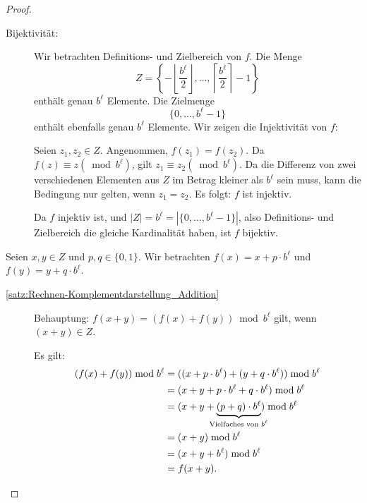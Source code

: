 \documentclass{article}
\begin{document}
    \begin{proof}
      \begin{description}
        \item[Bijektivität:] Wir betrachten Definitions- und Zielbereich von $f$.
          Die Menge \[Z = \left\{ - \left\lfloor \displaystyle\frac{b^\ell}{2} \right\rfloor , \dots, \left\lceil \displaystyle\frac{b^\ell}{2} \right\rceil -1 \right\}\] enthält genau $b^\ell$ Elemente.
          Die Zielmenge \[\{0,\dots,b^\ell-1\}\] enthält ebenfalls genau $b^\ell$ Elemente.
          Wir zeigen die Injektivität von $f$: 

          Seien $z_1, z_2 \in Z$. Angenommen, $f(z_1) = f(z_2)$.
          Da $f(z) \equiv z (\bmod b^\ell)$, gilt $z_1 \equiv z_2 (\bmod b^\ell)$.
          Da die Differenz von zwei verschiedenen Elementen aus $Z$ im Betrag kleiner als $b^\ell$ sein muss, kann die Bedingung nur gelten, wenn $z_1 = z_2$.
          Es folgt: $f$ ist injektiv.

          \noindent Da $f$ injektiv ist, und $|Z| = b^\ell = |\{0,\dots,b^\ell-1\}|$, also Definitions- und Zielbereich die gleiche Kardinalität haben, ist $f$ bijektiv.
      \end{description}

      \vspace{\baselineskip}

      Seien $x,y \in Z$ und $p,q \in \{0,1\}$. 
      Wir betrachten $f(x)=x + p\cdot b^\ell$ und $f(y)=y + q \cdot b^\ell$.
      
      \begin{description}
        \item[\ref{satz:Rechnen-Komplementdarstellung_Addition}] Behauptung: $f(x+y) = (f(x)+f(y)) \bmod b^\ell$ gilt, wenn $(x+y) \in Z$. 
          
          Es gilt:
          \begin{align*}
            (f(x)+f(y)) \bmod {b^\ell} &= ((x+p\cdot b^\ell) + (y+q\cdot b^\ell)) \bmod {b^\ell} \\
            &= (x+y+p \cdot b^\ell + q \cdot b^\ell) \bmod {b^\ell} \\
            &= (x+y+ \underbrace{(p+q)\cdot b^\ell}_{\mathclap{\text{Vielfaches von }b^\ell}}) \bmod {b^\ell} \\
            &= (x+y) \bmod {b^\ell} \\
            &= (x+y+b^\ell) \bmod {b^\ell} \\
            &= f(x+y).
          \end{align*}


\end{description}
\end{proof}
\end{document}
